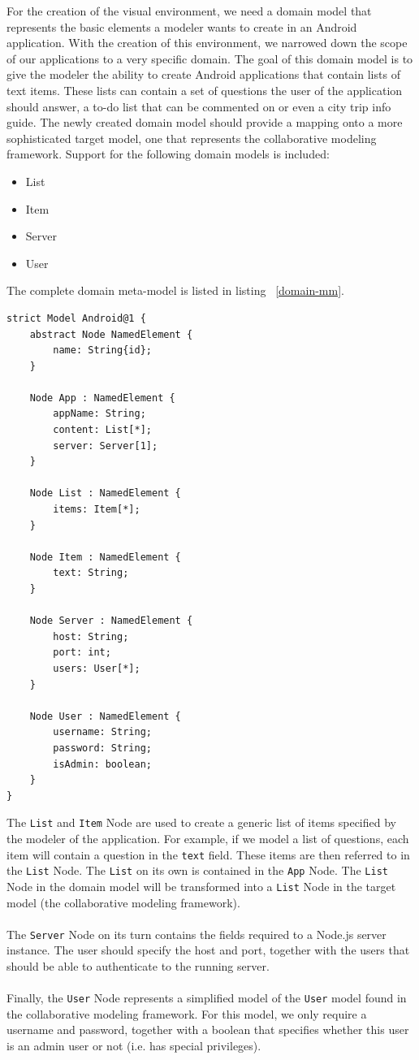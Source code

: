 For the creation of the visual environment, we need a domain model that represents the basic elements a modeler wants to create in an Android application. With the creation of this environment, we narrowed down the scope of our applications to a very specific domain. The goal of this domain model is to give the modeler the ability to create Android applications that contain lists of text items. These lists can contain a set of questions the user of the application should answer, a to-do list that can be commented on or even a city trip info guide. The newly created domain model should provide a mapping onto a more sophisticated target model, one that represents the collaborative modeling framework. Support for the following domain models is included:
\begin{itemize}
\item{List}
\item{Item}
\item{Server}
\item{User}
\end{itemize}
The complete domain meta-model is listed in listing ~\ref{domain-mm}.
\begin{lstlisting}[label=domain-mm,caption=Domain meta-model, captionpos=t]
strict Model Android@1 {
	abstract Node NamedElement {
		name: String{id};
	}

	Node App : NamedElement {
		appName: String;
		content: List[*];
		server: Server[1];
	}

	Node List : NamedElement {
		items: Item[*];
	}

	Node Item : NamedElement {
		text: String;
	}

	Node Server : NamedElement {
		host: String;
		port: int;
		users: User[*];
	}

	Node User : NamedElement {
		username: String;
		password: String;
		isAdmin: boolean;
	}
}
\end{lstlisting}
The \texttt{List} and \texttt{Item} Node are used to create a generic list of items specified by the modeler of the application. For example, if we model a list of questions, each item will contain a question in the \texttt{text} field. These items are then referred to in the \texttt{List} Node. The \texttt{List} on its own is contained in the \texttt{App} Node. The \texttt{List} Node in the domain model will be transformed into a \texttt{List} Node in the target model (the collaborative modeling framework). \\ \\
The \texttt{Server} Node on its turn contains the fields required to a Node.js server instance. The user should specify the host and port, together with the users that should be able to authenticate to the running server. \\ \\
Finally, the \texttt{User} Node represents a simplified model of the \texttt{User} model found in the collaborative modeling framework. For this model, we only require a username and password, together with a boolean that specifies whether this user is an admin user or not (i.e. has special privileges).

